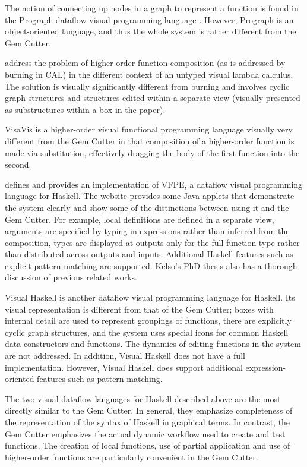 \documentclass[preprint]{sigplanconf}
\let\cite=\citep
\begin{document}
The notion of connecting up nodes in a graph to represent a function
is found in the Prograph dataflow visual programming language
\cite{cox89}. However, Prograph is an object-oriented language, and
thus the whole system is rather different from the Gem Cutter.

\citet{dami96} address the problem of higher-order function
composition (as is addressed by burning in CAL) in the different
context of an untyped visual lambda calculus. The solution is
visually significantly different from burning and involves
cyclic graph structures and structures edited within a separate view
(visually presented as substructures within a box in the paper).

VisaVis \cite{poswig94} is a higher-order visual functional programming language
visually very different from the Gem Cutter in that
composition of a higher-order function is made via substitution,
effectively dragging the body of the first function into the second.

\citet{kelso02} defines and provides an implementation of
VFPE, a dataflow visual programming language for Haskell. The website
provides some Java applets that demonstrate the system clearly and
show some of the distinctions between using it and the Gem Cutter. For
example, local definitions are defined in a separate view, arguments
are specified by typing in expressions rather than inferred from the
composition, types are displayed at outputs only for the full function
type rather than distributed across outputs and inputs. Additional Haskell
features such as explicit pattern matching are supported. Kelso's PhD thesis
also has a thorough discussion of previous related works.

Visual Haskell \cite{reekie95} is another dataflow visual
programming language for Haskell. Its visual representation is
different from that of the Gem Cutter; boxes with internal detail are
used to represent groupings of functions, there are explicitly cyclic
graph structures, and the system uses special icons for common Haskell
data constructors and functions. The dynamics of editing functions in
the system are not addressed. In addition, Visual Haskell does not
have a full implementation. However, Visual Haskell does 
support additional expression-oriented features such as pattern
matching.

The two visual dataflow languages for Haskell described above are the most
directly similar to the Gem Cutter. In general, they emphasize
completeness of the representation of the syntax of Haskell in
graphical terms. In contrast, the Gem Cutter emphasizes the actual
dynamic workflow used to create and test functions. The creation of 
local functions, use of partial application and use of higher-order
functions are particularly convenient in the Gem Cutter.
\end{document}

